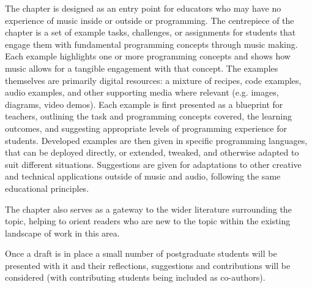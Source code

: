 The chapter is designed as an entry point for educators who may have no experience of music inside or outside or programming. The centrepiece of the chapter is a set of example tasks, challenges, or assignments for students that engage them with fundamental programming concepts through music making. Each example highlights one or more programming concepts and shows how music allows for a tangible engagement with that concept. The examples themselves are primarily digital resources: a mixture of recipes, code examples, audio examples, and other supporting media where relevant (e.g. images, diagrams, video demos). Each example is first presented as a blueprint for teachers, outlining the task and programming concepts covered, the learning outcomes, and suggesting appropriate levels of programming experience for students. Developed examples are then given in specific programming languages, that can be deployed directly, or extended, tweaked, and otherwise adapted to suit different situations. Suggestions are given for adaptations to other creative and technical applications outside of music and audio, following the same educational principles.

The chapter also serves as a gateway to the wider literature surrounding the topic, helping to orient readers who are new to the topic within the existing landscape of work in this area.

Once a draft is in place a small number of postgraduate students will be presented with it and their reflections, suggestions and contributions will be considered (with contributing students being included as co-authors).
